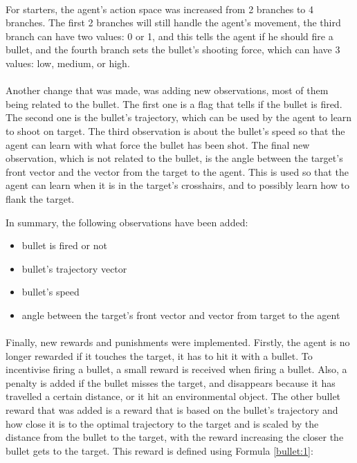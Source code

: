 \paragraph{}
For starters, the agent's action space was increased from 2 branches to 4 branches. The first 2 branches will still handle the agent's movement, the third branch can have two values: 0 or 1, and this tells the agent if he should fire a bullet, and the fourth branch sets the bullet's shooting force, which can have 3 values: low, medium, or high.

\paragraph{}
Another change that was made, was adding new observations, most of them being related to the bullet. The first one is a flag that tells if the bullet is fired. The second one is the bullet's trajectory, which can be used by the agent to learn to shoot on target. The third observation is about the bullet's speed so that the agent can learn with what force the bullet has been shot. The final new observation, which is not related to the bullet, is the angle between the target's front vector and the vector from the target to the agent. This is used so that the agent can learn when it is in the target's crosshairs, and to possibly learn how to flank the target. 

In summary, the following observations have been added:
\begin{itemize}
    \item bullet is fired or not
    \item bullet's trajectory vector
    \item bullet's speed
    \item angle between the target's front vector and vector from target to the agent
\end{itemize}


\paragraph{}
Finally, new rewards and punishments were implemented. Firstly, the agent is no longer rewarded if it touches the target, it has to hit it with a bullet. To incentivise firing a bullet, a small reward is received when firing a bullet. Also, a penalty is added if the bullet misses the target, and disappears because it has travelled a certain distance, or it hit an environmental object. The other bullet reward that was added is a reward that is based on the bullet's trajectory and how close it is to the optimal trajectory to the target and is scaled by the distance from the bullet to the target, with the reward increasing the closer the bullet gets to the target. This reward is defined using Formula \ref{bullet:1}:

